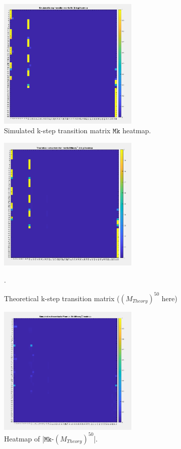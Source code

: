 \documentclass[12pt]{article}
\begin{document}
\begin{figure}[h!]
    \centering
    \includegraphics[width=0.6\textwidth]{media/4.jpg}
    \caption{Simulated k-step transition matrix $\texttt{Mk}$ heatmap.}
    \label{fig:myimage}
\end{figure}
\begin{figure}[h!]
    \centering
    \includegraphics[width=0.6\textwidth]{media/5.jpg}
    \caption{Theoretical k-step transition matrix ($({M_{Theory}})^{50}$ here) }.
    \label{fig:myimage}
\end{figure}
\begin{figure}[h!]
    \centering
    \includegraphics[width=0.6\textwidth]{media/6.jpg}
    \caption{Heatmap of |$\texttt{Mk}$-$({M_{Theory}})^{50}$|.}
    \label{fig:myimage}
\end{figure}
\end{document}
